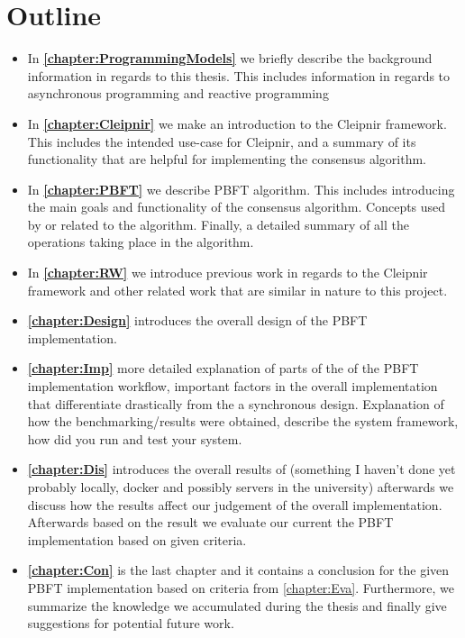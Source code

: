 \section{Outline}
\begin{itemize}
\item In \textbf{\autoref{chapter:ProgrammingModels}} we briefly describe the background information in regards to this thesis. This includes information in regards to asynchronous programming and reactive programming

\item In \textbf{\autoref{chapter:Cleipnir}} we make an introduction to the Cleipnir framework. This includes the intended use-case for Cleipnir, and a summary of its functionality that are helpful for implementing the consensus algorithm. 

\item In \textbf{\autoref{chapter:PBFT}} we describe PBFT algorithm. This includes introducing the main goals and functionality of the consensus algorithm. Concepts used by or related to the algorithm. Finally, a detailed summary of all the operations taking place in the algorithm.

\item In \textbf{\autoref{chapter:RW}} we introduce previous work in regards to the Cleipnir framework and other related work that are similar in nature to this project.

\item \textbf{\autoref{chapter:Design}} introduces the overall design of the PBFT implementation.

\item \textbf{\autoref{chapter:Imp}} more detailed explanation of parts of the of the PBFT implementation workflow, important factors in the overall implementation that differentiate drastically from the a synchronous design. Explanation of how the benchmarking/results were obtained, describe the system framework, how did you run and test your system.

\item \textbf{\autoref{chapter:Dis}} introduces the overall results of (something I haven't done yet probably locally, docker and possibly servers in the university) afterwards we discuss how the results affect our judgement of the overall implementation. Afterwards based on the result we evaluate our current the PBFT implementation based on given criteria.

\item \textbf{\autoref{chapter:Con}} is the last chapter and it contains a conclusion for the given PBFT implementation based on criteria from \autoref{chapter:Eva}. Furthermore, we summarize the knowledge we accumulated during the thesis and finally give suggestions for potential future work.
\end{itemize}